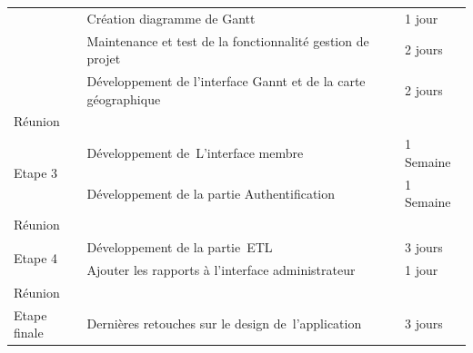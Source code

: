 \begin{table}
\begin{tabular}{|l|l|l|}
\cline{2-3}
                                & Création diagramme de Gantt                                                                                                                    & 1 jour                \\
\cline{2-3}
                                & Maintenance et test de la fonctionnalité gestion de projet                                                                                     & 2 jours               \\
\cline{2-3}
                                & Développement de l’interface Gannt et de la carte géographique                                                                                 & 2 jours               \\
\hline
\multicolumn{3}{|l|}{Réunion}                                                                                                                                                                            \\
\hline
\multirow{2}{*}{Etape 3}        & Développement de~L’interface membre                                                                                                            & 1 Semaine             \\
\cline{2-3}
                                & Développement de la partie Authentification                                                                                                    & 1 Semaine             \\
\hline
\multicolumn{3}{|l|}{Réunion}                                                                                                                                                                            \\
\hline
\multirow{2}{*}{Etape 4}        & Développement de la partie~ETL                                                                                                                 & 3 jours               \\
\cline{2-3}
                                & Ajouter les rapports à l’interface administrateur                                                                                              & 1 jour                \\
\hline
\multicolumn{3}{|l|}{Réunion}                                                                                                                                                                            \\
\hline
\multirow{2}{*}{Etape finale}   & Dernières retouches sur le design de~l’application                                                                                             & 3 jours               \\

\end{tabular}
\end{table}
